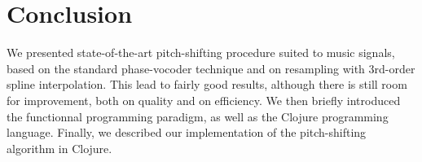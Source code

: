\documentclass[letterpaper]{article}
\theoremstyle{definition}
\theoremstyle{remark}
\theoremstyle{plain}
\begin{document}
\section{Conclusion}
We presented state-of-the-art pitch-shifting procedure suited to music signals,
based on the standard phase-vocoder technique and on resampling with 3rd-order
spline interpolation. This lead to fairly good results, although there is still
room for improvement, both on quality and on efficiency. We then briefly
introduced the functionnal programming paradigm, as well as the Clojure
programming language. Finally, we described our implementation of the
pitch-shifting algorithm in Clojure.

\footnotesize


\end{document}
